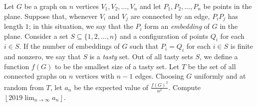 Let $G$ be a graph on $n$ vertices $V_1,V_2,\dots, V_n$ and let $P_1,P_2, \dots, P_n$ be points in the plane. Suppose that, whenever $V_i$ and $V_j$ are connected by an edge, $P_iP_j$ has length $1$; in this situation, we say that the $P_i$ form an \emph{embedding} of $G$ in the plane. Consider a set $S\subseteq \{1,2,\dots, n\}$ and a configuration of points $Q_i$ for each $i\in S$. If the number of embeddings of $G$ such that $P_i=Q_i$ for each $i\in S$ is finite and nonzero, we say that $S$ is a \emph{tasty} set. Out of all tasty sets $S$, we define a function $f(G)$ to be the smallest size of a tasty set. Let $T$ be the set of all connected graphs on $n$ vertices with $n-1$ edges. Choosing $G$ uniformly and at random from $T$, let $a_n$ be the expected value of $\frac{f(G)^2}{n^2}$. Compute $\left\lfloor 2019 \displaystyle\lim_{n\to \infty} a_n \right\rfloor$.
